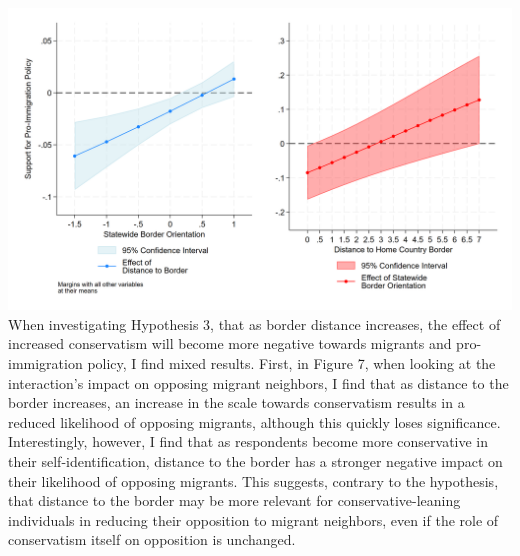 \documentclass[12pt,]{article}
\begin{document}
\includegraphics{figures/m4a_policy_marginal_1.png} When investigating
Hypothesis 3, that as border distance increases, the effect of increased
conservatism will become more negative towards migrants and
pro-immigration policy, I find mixed results. First, in Figure 7, when
looking at the interaction's impact on opposing migrant neighbors, I
find that as distance to the border increases, an increase in the scale
towards conservatism results in a reduced likelihood of opposing
migrants, although this quickly loses significance. Interestingly,
however, I find that as respondents become more conservative in their
self-identification, distance to the border has a stronger negative
impact on their likelihood of opposing migrants. This suggests, contrary
to the hypothesis, that distance to the border may be more relevant for
conservative-leaning individuals in reducing their opposition to migrant
neighbors, even if the role of conservatism itself on opposition is
unchanged.
\end{document}
